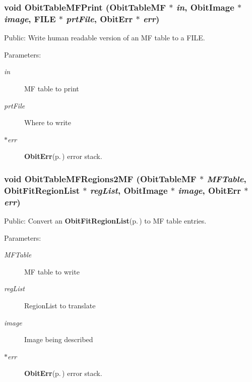 \subsubsection{\setlength{\rightskip}{0pt plus 5cm}void Obit\-Table\-MFPrint ({\bf Obit\-Table\-MF} $\ast$ {\em in}, {\bf Obit\-Image} $\ast$ {\em image}, FILE $\ast$ {\em prt\-File}, {\bf Obit\-Err} $\ast$ {\em err})}\label{ObitTableMFUtil_8h_a2}


Public: Write human readable version of an MF table to a FILE. 

\begin{Desc}
\item[Parameters:]
\begin{description}
\item[{\em in}]MF table to print \item[{\em prt\-File}]Where to write \item[{\em $\ast$err}]{\bf Obit\-Err}{\rm (p.\,\pageref{structObitErr})} error stack. \end{description}
\end{Desc}
\subsubsection{\setlength{\rightskip}{0pt plus 5cm}void Obit\-Table\-MFRegions2MF ({\bf Obit\-Table\-MF} $\ast$ {\em MFTable}, {\bf Obit\-Fit\-Region\-List} $\ast$ {\em reg\-List}, {\bf Obit\-Image} $\ast$ {\em image}, {\bf Obit\-Err} $\ast$ {\em err})}\label{ObitTableMFUtil_8h_a0}


Public: Convert an {\bf Obit\-Fit\-Region\-List}{\rm (p.\,\pageref{structObitFitRegionList})} to MF table entries. 

\begin{Desc}
\item[Parameters:]
\begin{description}
\item[{\em MFTable}]MF table to write \item[{\em reg\-List}]Region\-List to translate \item[{\em image}]Image being described \item[{\em $\ast$err}]{\bf Obit\-Err}{\rm (p.\,\pageref{structObitErr})} error stack. \end{description}
\end{Desc}
